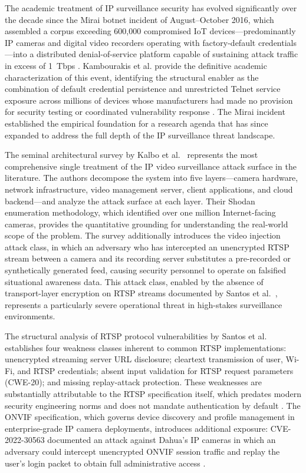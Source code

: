\documentclass[letterpaper, 10pt, conference]{ieeeconf}
\begin{document}
The academic treatment of IP surveillance security has evolved
significantly over the decade since the Mirai botnet incident of
August--October 2016, which assembled a corpus exceeding 600,000
compromised IoT devices---predominantly IP cameras and digital video
recorders operating with factory-default credentials---into a
distributed denial-of-service platform capable of sustaining attack
traffic in excess of 1~Tbps \cite{kambourakis2017}. Kambourakis et al.
provide the definitive academic characterization of this event,
identifying the structural enabler as the combination of default
credential persistence and unrestricted Telnet service exposure across
millions of devices whose manufacturers had made no provision for
security testing or coordinated vulnerability response \cite{kambourakis2017}.
The Mirai incident established the empirical foundation for a research
agenda that has since expanded to address the full depth of the
IP surveillance threat landscape.

The seminal architectural survey by Kalbo et al.~\cite{kalbo2020}
represents the most comprehensive single treatment of the IP video
surveillance attack surface in the literature. The authors decompose
the system into five layers---camera hardware, network infrastructure,
video management server, client applications, and cloud backend---and
analyze the attack surface at each layer. Their Shodan enumeration
methodology, which identified over one million Internet-facing cameras,
provides the quantitative grounding for understanding the real-world
scope of the problem. The survey additionally introduces the video
injection attack class, in which an adversary who has intercepted
an unencrypted RTSP stream between a camera and its recording server
substitutes a pre-recorded or synthetically generated feed, causing
security personnel to operate on falsified situational awareness data.
This attack class, enabled by the absence of transport-layer
encryption on RTSP streams documented by Santos et al.~\cite{santos2023},
represents a particularly severe operational threat in high-stakes
surveillance environments.

The structural analysis of RTSP protocol vulnerabilities by Santos et
al.~\cite{santos2023} establishes four weakness classes inherent to
common RTSP implementations: unencrypted streaming server URL disclosure;
cleartext transmission of user, Wi-Fi, and RTSP credentials; absent
input validation for RTSP request parameters (CWE-20); and missing
replay-attack protection. These weaknesses are substantially attributable
to the RTSP specification itself, which predates modern security
engineering norms and does not mandate authentication by default
\cite{santos2023}. The ONVIF specification, which governs device
discovery and profile management in enterprise-grade IP camera
deployments, introduces additional exposure: CVE-2022-30563 documented
an attack against Dahua's IP cameras in which an adversary could
intercept unencrypted ONVIF session traffic and replay the user's
login packet to obtain full administrative access \cite{securithings2022}.
\end{document}
